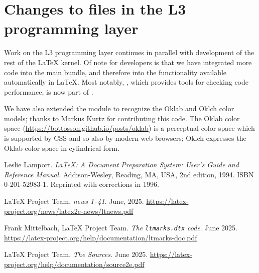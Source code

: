 \documentclass{ltnews}
\begin{document}
\section{Changes to files in the L3 programming layer}


Work on the L3 programming layer continues in parallel with
development of the rest of the \LaTeX{} kernel.  Of note for
developers is that we have integrated more code into the main
 bundle, and therefore into the functionality available
automatically in \LaTeX{}. Most notably, , which
provides tools for checking code performance, is now part of
.

We have also extended the  module to recognize the Oklab
and Oklch color models; thanks to Markus Kurtz for contributing this
code. The Oklab color space
(\url{https://bottosson.github.io/posts/oklab}) is a perceptual color
space which is supported by CSS and so also by modern web browsers;
Oklch expresses the Oklab color space in cylindrical form.


\begin{thebibliography}{9}\frenchspacing


Leslie Lamport.
\newblock \emph{{\LaTeX}: {A} Document Preparation System: User's Guide and Reference
  Manual}.
\newblock \mbox{Addison}-Wesley, Reading, MA, USA, 2nd edition, 1994.
\newblock ISBN 0-201-52983-1.
\newblock Reprinted with corrections in 1996.

 \LaTeX{} Project Team.
  \emph{\LaTeXe{} news 1--41}. June, 2025.
  \url{https://latex-project.org/news/latex2e-news/ltnews.pdf}

 Frank Mittelbach, \LaTeX{} Project Team.
  \emph{The \texttt{ltmarks.dtx} code}. June 2025.
  \url{https://latex-project.org/help/documentation/ltmarks-doc.pdf}

 \LaTeX{} Project Team.
  \emph{The \LaTeXe{} Sources}. June 2025.
  \url{https://latex-project.org/help/documentation/source2e.pdf}

\end{thebibliography}
\end{document}
